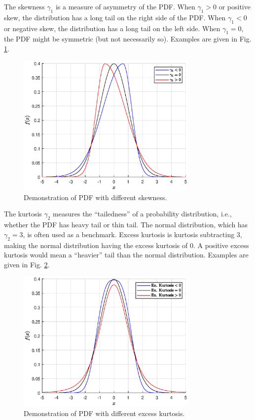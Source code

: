 The skewness $\gamma_1$ is a measure of asymmetry of the PDF. When $\gamma_1 > 0$ or positive skew, the distribution has a long tail on the right side of the PDF. When $\gamma_1 <0$ or negative skew, the distribution has a long tail on the left side. When $\gamma_1 = 0$, the PDF might be symmetric (but not necessarily so). Examples are given in Fig. \ref{fig:skewness_demo}.
\begin{figure}
	\centering
	\includegraphics[width=250pt]{chapters/ch-measures-of-distribution/figures/skewness_demo.eps}
	\caption{Demonstration of PDF with different skewness.} \label{fig:skewness_demo}
\end{figure}

The kurtosis $\gamma_2$ measures the ``tailedness'' of a probability distribution, i.e., whether the PDF has heavy tail or thin tail. The normal distribution, which has $\gamma_2=3$, is often used as a benchmark. Excess kurtosis is kurtosis subtracting $3$, making the normal distribution having the excess kurtosis of $0$. A positive excess kurtosis would mean a ``heavier'' tail than the normal distribution. Examples are given in Fig. \ref{fig:kurtosis_demo}.
\begin{figure}
	\centering
	\includegraphics[width=250pt]{chapters/ch-measures-of-distribution/figures/kurtosis_demo.eps}
	\caption{Demonstration of PDF with different excess kurtosis.} \label{fig:kurtosis_demo}
\end{figure}

